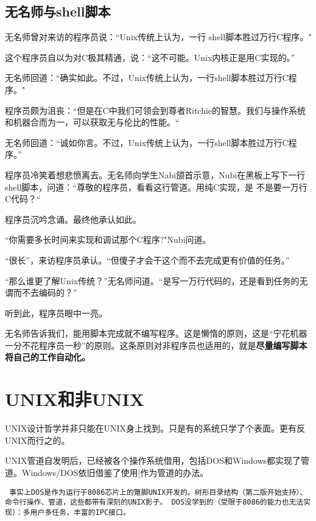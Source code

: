 \documentclass[amstex,twoside]{ctexbook}
\newenvironment{notice}{\tt}{}
\newenvironment{insertnote}{ \ttfamily\CJKfamily{KaiTi} }{\vskip 1cm }
\begin{document}
\begin{insertnote}
\subsection*{无名师与shell脚本}

无名师曾对来访的程序员说：“Unix传统上认为，一行 shell脚本胜过万行C程序。" 

这个程序员自以为对C极其精通，说：“这不可能。Unix内核正是用C实现的。” 

无名师回道：“确实如此。不过，Unix传统上认为，一行shell脚本胜过万行C程序。" 

程序员颇为沮丧：“但是在C中我们可领会到尊者Ritchie的智慧。我们与操作系统和机器合而为一，可以获取无与伦比的性能。“ 

无名师回道：“诚如你言。不过，Unix传统上认为，一行shell脚本胜过万行C程序。” 

程序员冷笑着想悲愤离去。无名师向学生Nabi颌首示意，Nubi在黑板上写下一行shell脚本，问道：“尊敬的程序员，看看这行管道。用纯C实现，是 不是要一万行C代码？“ 

程序员沉吟念诵。最终他承认如此。 

“你需要多长时间来实现和调试那个C程序?"Nubi问道。 

“很长”，来访程序员承认。“但傻子才会干这个而不去完成更有价值的任务。” 

“那么谁更了解Unix传统？”无名师问道。“是写一万行代码的，还是看到任务的无谓而不去编码的？” 

听到此，程序员眼中一亮。
\end{insertnote}

无名师告诉我们，能用脚本完成就不编写程序。这是懒惰的原则，这是“宁花机器一分不花程序员一秒”的原则。这条原则对非程序员也适用的，就是\textbf{尽量编写脚本将自己的工作自动化。}


\section{UNIX和非UNIX}
UNIX设计哲学并非只能在UNIX身上找到。只是有的系统只学了个表面。更有反UNIX而行之的。

UNIX管道自发明后，已经被各个操作系统借用，包括DOS和Windows都实现了管道。Windows/DOS依旧借鉴了使用|作为管道的办法。
\par\begin{notice}
事实上DOS是作为运行于8086芯片上的蹩脚UNIX开发的。树形目录结构（第二版开始支持）、命令行操作、管道，这些都带有深刻的UNIX影子。
DOS没学到的（受限于8086的能力也无法实现）：多用户多任务，丰富的IPC接口。
\end{notice}
\end{document}
